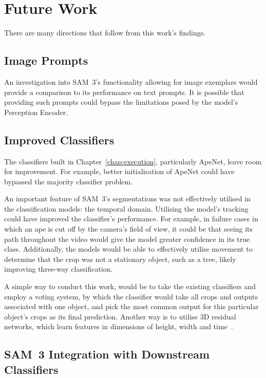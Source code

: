\documentclass[author={Jacob Stephenson},
    degree={BSc},
    title={Robust Great Ape Species Detection in Wild Camera Trap Imagery with Promptable Concept Segmentation},
    unit={COMS30045},
    subtitle={}]{dissertation}
\begin{document}
\section{Future Work}

There are many directions that follow from this work's findings. 

\subsection{Image Prompts}

An investigation into SAM~3's functionality allowing for image exemplars would provide a comparison to its performance on text prompts. It is possible that providing such prompts could bypass the limitations posed by the model's Perception Encoder.

\subsection{Improved Classifiers}

The classifiers built in Chapter~\ref{chap:execution}, particularly ApeNet, leave room for improvement. For example, better initialisation of ApeNet could have bypassed the majority classifier problem.

An important feature of SAM~3's segmentations was not effectively utilised in the classification models: the temporal domain. Utilising the model's tracking could have improved the classifier's performance. For example, in failure cases in which an ape is cut off by the camera's field of view, it could be that seeing its path throughout the video would give the model greater confidence in its true class. Additionally, the models would be able to effectively utilise movement to determine that the crop was not a stationary object, such as a tree, likely improving three-way classification.

A simple way to conduct this work, would be to take the existing classifiers and employ a voting system, by which the classifier would take all crops and outputs associated with one object, and pick the most common output for this particular object's crops as its final prediction. Another way is to utilise 3D residual networks, which learn features in dimensions of height, width and time~\cite{hara2017learningspatiotemporalfeatures3d}.

\subsection{SAM~3 Integration with Downstream Classifiers}
\end{document}
